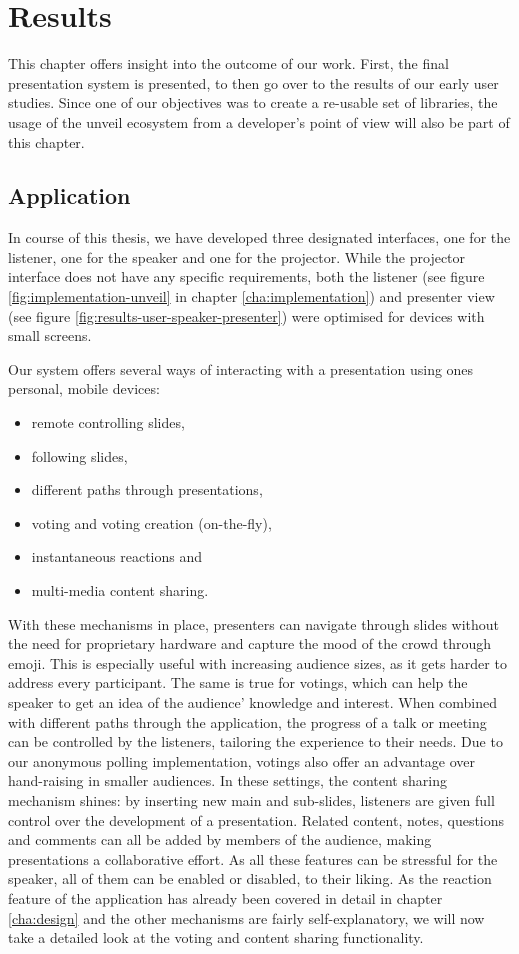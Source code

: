 \chapter{Results}
\label{cha:results}

This chapter offers insight into the outcome of our work. First, the final presentation system is presented, to then go over to the results of our early user studies. Since one of our objectives was to create a re-usable set of libraries, the usage of the unveil ecosystem from a developer's point of view will also be part of this chapter.

\section{Application}
\label{sec:results-user}
In course of this thesis, we have developed three designated interfaces, one for the listener, one for the speaker and one for the projector. While the projector interface does not have any specific requirements, both the listener (see figure \ref{fig:implementation-unveil} in chapter \ref{cha:implementation}) and presenter view (see figure \ref{fig:results-user-speaker-presenter}) were optimised for devices with small screens.

Our system offers several ways of interacting with a presentation using ones personal, mobile devices:
\begin{itemize}
\item remote controlling slides,
\item following slides,
\item different paths through presentations,
\item voting and voting creation (on-the-fly),
\item instantaneous reactions and
\item multi-media content sharing.
\end{itemize}
%
With these mechanisms in place, presenters can navigate through slides without the need for proprietary hardware and capture the mood of the crowd through emoji. This is especially useful with increasing audience sizes, as it gets harder to address every participant. The same is true for votings, which can help the speaker to get an idea of the audience' knowledge and interest. When combined with different paths through the application, the progress of a talk or meeting can be controlled by the listeners, tailoring the experience to their needs. Due to our anonymous polling implementation, votings also offer an advantage over hand-raising in smaller audiences. In these settings, the content sharing mechanism shines: by inserting new main and sub-slides, listeners are given full control over the development of a presentation. Related content, notes, questions and comments can all be added by members of the audience, making presentations a collaborative effort. As all these features can be stressful for the speaker, all of them can be enabled or disabled, to their liking.
As the reaction feature of the application has already been covered in detail in chapter \ref{cha:design} and the other mechanisms are fairly self-explanatory, we will now take a detailed look at the voting and content sharing functionality.

